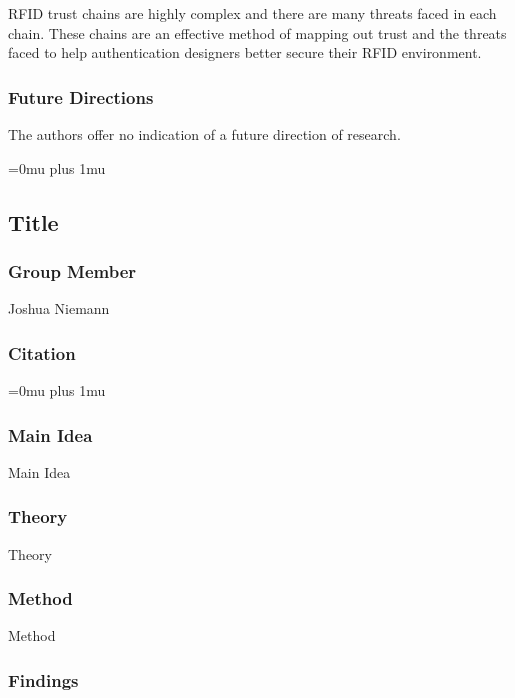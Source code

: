 \noindent
RFID trust chains are highly complex and there are many threats faced in each chain. These chains are an effective method of mapping out trust and the threats faced to help authentication designers better secure their RFID environment. 

\subsubsection{Future Directions}

\noindent
The authors offer no indication of a future direction of research. 

\Urlmuskip=0mu plus 1mu\relax

\noindent
\subsection{Title}

\subsubsection{Group Member}

\noindent
Joshua Niemann

\noindent
\subsubsection{Citation}

\Urlmuskip=0mu plus 1mu\relax

\subsubsection{Main Idea}

\noindent
Main Idea

\subsubsection{Theory}

\noindent
Theory

\subsubsection{Method}

\noindent
Method

\subsubsection{Findings}

